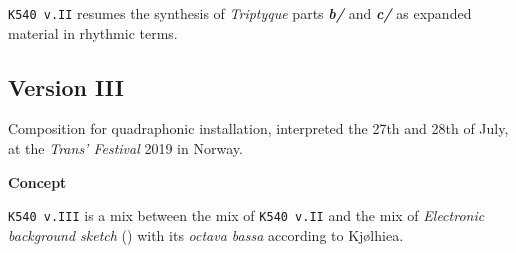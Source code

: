 \smallskip

\texttt{K540 v.II} resumes the synthesis of \textit{Triptyque} parts \textbf{\textit{b/}} and  \textbf{\textit{c/}} as expanded material in rhythmic terms.%

\subsection[\texttt{v.III}]{Version III}

\smallskip

Composition for quadraphonic installation, interpreted the 27th and 28th of July, at the \textit{Trans' Festival }2019 in Norway. %

\bigskip

\noindent \textbf{{\large Concept}}
\hrulefill

\bigskip

\texttt{K540 v.III} is a mix between the mix of \texttt{K540 v.II} and the mix of \textsl{Electronic background sketch} () with its \textit{octava bassa} according to Kj{\o}lhiea. 